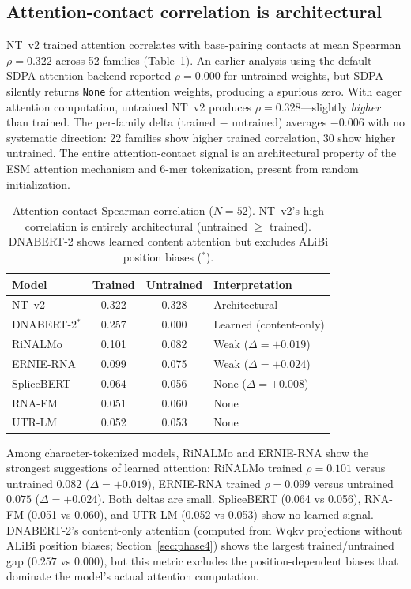 \documentclass[11pt]{article}
\begin{document}
\subsection{Attention-contact correlation is architectural}
\label{sec:attn_results}

NT~v2 trained attention correlates with base-pairing contacts at mean
Spearman $\rho = 0.322$ across 52 families
(Table~\ref{tab:attention}).  An earlier analysis using the default
SDPA attention backend reported $\rho = 0.000$ for untrained weights,
but SDPA silently returns \texttt{None} for attention weights,
producing a spurious zero.  With eager attention computation,
untrained NT~v2 produces $\rho = 0.328$---slightly \emph{higher} than
trained.  The per-family delta (trained $-$ untrained) averages
$-0.006$ with no systematic direction: 22 families show higher trained
correlation, 30 show higher untrained.  The entire attention-contact
signal is an architectural property of the ESM attention mechanism and
6-mer tokenization, present from random initialization.

\begin{table}[t]
\centering
\caption{Attention-contact Spearman correlation ($N = 52$).  NT~v2's
  high correlation is entirely architectural (untrained $\geq$
  trained).  DNABERT-2 shows learned content attention but excludes
  ALiBi position biases ($^*$).}
\label{tab:attention}
\begin{tabular}{@{}lccl@{}}
\toprule
\textbf{Model} & \textbf{Trained} & \textbf{Untrained} &
  \textbf{Interpretation} \\
\midrule
NT~v2      & 0.322 & 0.328 & Architectural \\
DNABERT-2$^*$  & 0.257 & 0.000 & Learned (content-only) \\
RiNALMo    & 0.101 & 0.082 & Weak ($\Delta = +0.019$) \\
ERNIE-RNA  & 0.099 & 0.075 & Weak ($\Delta = +0.024$) \\
SpliceBERT & 0.064 & 0.056 & None ($\Delta = +0.008$) \\
RNA-FM     & 0.051 & 0.060 & None \\
UTR-LM     & 0.052 & 0.053 & None \\
\bottomrule
\end{tabular}
\end{table}

Among character-tokenized models, RiNALMo and ERNIE-RNA show the
strongest suggestions of learned attention: RiNALMo trained $\rho =
0.101$ versus untrained $0.082$ ($\Delta = +0.019$), ERNIE-RNA
trained $\rho = 0.099$ versus untrained $0.075$ ($\Delta = +0.024$).
Both deltas are small.  SpliceBERT (0.064 vs 0.056), RNA-FM (0.051
vs 0.060), and UTR-LM (0.052 vs 0.053) show no learned signal.
DNABERT-2's content-only attention (computed from Wqkv projections
without ALiBi position biases; Section~\ref{sec:phase4}) shows the
largest trained/untrained gap ($0.257$ vs $0.000$), but this metric
excludes the position-dependent biases that dominate the model's
actual attention computation.
\end{document}
